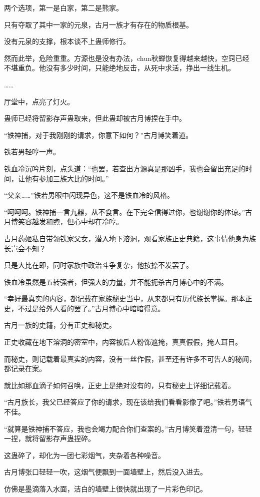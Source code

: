 \begin{this_body}
两个选项，第一是白家，第二是熊家。

只有夺取了其中一家的元泉，古月一族才有存在的物质根基。

没有元泉的支撑，根本谈不上蛊师修行。

然而此举，危险重重。方源也是没有办法，chun秋蝉恢复得越来越快，空窍已经不堪重负。他没有多少时间，只能绝地反击，从死中求活，挣出一线生机。

……

厅堂中，点亮了灯火。

蛊师已经将留影存声蛊取来，但此蛊却被古月博捏在手中。

“铁神捕，对于我刚刚的请求，你意下如何？”古月博笑着道。

铁若男轻哼一声。

铁血冷沉吟片刻，点头道：“也罢，若查出方源真是那凶手，我也会留出充足的时间，让他有参加三族大比的时间。”

“父亲……”铁若男眼中闪现异色，这不是铁血冷的风格。

“呵呵呵。铁神捕一言九鼎，从不食言。在下完全信得过你，也谢谢你的体谅。”古月博笑容越发和煦，但心中却在冷哼。

古月药姬私自带领铁家父女，潜入地下溶洞，观看家族正史典籍，这事情他身为族长岂会不知？

只是大比在即，同时家族中政治斗争复杂，他按捺不发罢了。

铁血冷虽然是五转强者，但强大的力量，并不能扼杀古月博心中的不满。

“幸好最真实的内容，都记载在家族秘史当中，从来都只有历代族长掌握。那本正史，不过是给外人看的罢了。”古月博心中暗暗得意。

古月一族的史籍，分有正史和秘史。

正史收藏在地下溶洞的密室中，内容被后人粉饰遮掩，真真假假，掩人耳目。

而秘史，则记载着最真实的内容，没有一丝作假，甚至还有许多不可告人的秘闻，都记录在案。

就比如那血滴子如何召唤，正史上是绝对没有的，只有秘史上详细记载着。

“古月族长，我父已经答应了你的请求，现在该给我们看看影像了吧。”铁若男语气不佳。

“就算是铁神捕不答应，我也会竭力配合你们查案的。”古月博笑着澄清一句，轻轻一捏，就将留影存声蛊捏碎。

这蛊碎了，却化为一团七彩烟气，夹杂着各种噪音。

古月博张口轻轻一吹，这烟气便飘到一面墙壁上，然后没入进去。

仿佛是墨滴落入水面，洁白的墙壁上很快就出现了一片彩色印记。


\end{this_body}
